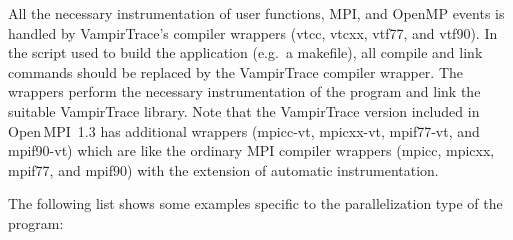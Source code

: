 \documentclass[a4paper,twoside,12pt,BCOR12mm]{scrbook}
\begin{document}
All the necessary instrumentation of user functions, MPI, and\latex{\linebreak}
OpenMP events is handled by VampirTrace's compiler wrappers (vtcc, vtcxx, vtf77, and
vtf90).
In the script used to build the application (e.g.~a makefile), all compile
and link commands should be replaced by the VampirTrace compiler wrapper.
The wrappers perform the necessary instrumentation of the program and link
the suitable VampirTrace library.
Note that the VampirTrace version included in Open\,MPI~1.3
has additional wrappers (mpicc-vt, mpicxx-vt, mpif77-vt, and mpif90-vt) which
are like the ordinary MPI compiler wrappers (mpicc, mpicxx, mpif77, and mpif90)
with the extension of automatic instrumentation.

The following list shows some examples specific to the parallelization
type of the program:
\end{document}
